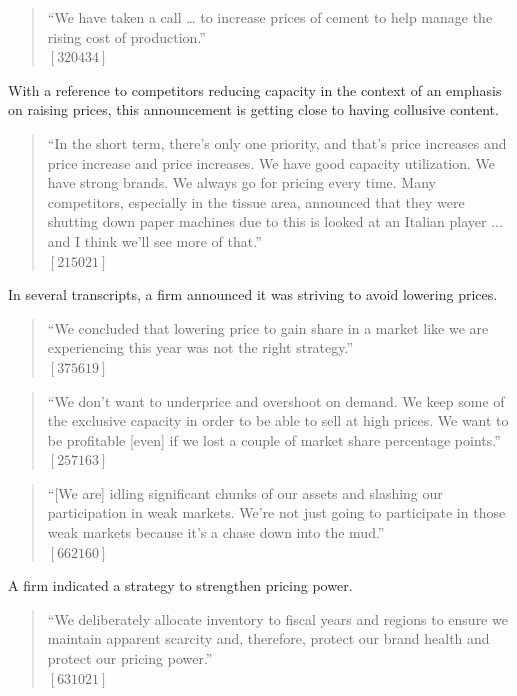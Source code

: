\begin{quote}
``We have taken a call … to increase prices of cement to help manage the rising cost of production.'' \\
$[320434]$
\end{quote}

With a reference to competitors reducing capacity in the context of an emphasis on raising prices, this announcement is getting close to having collusive content.

\begin{quote}
``In the short term, there's only one priority, and that's price increases and price increase and price increases. We have good capacity utilization. We have strong brands. We always go for pricing every time. Many competitors, especially in the tissue area, announced that they were shutting down paper machines due to this is looked at an Italian player ... and I think we'll see more of that.'' \\
$[215021]$
\end{quote}

In several transcripts, a firm announced it was striving to avoid lowering prices.

\begin{quote}
``We concluded that lowering price to gain share in a market like we are experiencing this year was not the right strategy.'' \\
$[375619]$
\end{quote}

\begin{quote}
``We don't want to underprice and overshoot on demand. We keep some of the exclusive capacity in order to be able to sell at high prices. We want to be profitable [even] if we lost a couple of market share percentage points.'' \\
$[257163]$
\end{quote}

\begin{quote}
``[We are] idling significant chunks of our assets and slashing our participation in weak markets. We're not just going to participate in those weak markets because it's a chase down into the mud.'' \\
$[662160]$
\end{quote}

A firm indicated a strategy to strengthen pricing power.

\begin{quote}
``We deliberately allocate inventory to fiscal years and regions to ensure we maintain apparent scarcity and, therefore, protect our brand health and protect our pricing power.'' \\
$[631021]$
\end{quote}

